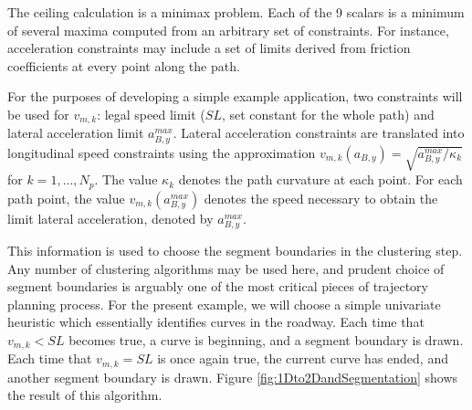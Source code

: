 \documentclass[letterpaper, 10 pt, conference]{ieeeconf}  %
\begin{document}
The ceiling calculation is a minimax problem.
Each of the 9 scalars is a minimum of several maxima computed from an arbitrary set of constraints.
For instance, acceleration constraints may include a set of limits derived from friction coefficients at every point along the path.

For the purposes of developing a simple example application, two constraints will be used for $v_{m,k}$: legal speed limit ($SL$, set constant for the whole path) and lateral acceleration limit $a_{B,y}^{max}$. 
Lateral acceleration constraints are translated into longitudinal speed constraints using the approximation $v_{m,k}(a_{B,y}) = \sqrt{a_{B,y}^{max}/\kappa_k}$ for $k = 1, ..., N_p$.
The value $\kappa_k$ denotes the path curvature at each point.
For each path point, the value $v_{m,k}(a_{B,y}^{max})$ denotes the speed necessary to obtain the limit lateral acceleration, denoted by $a^{max}_{B,y}$.

This information is used to choose the segment boundaries in the clustering step.
Any number of clustering algorithms may be used here, and prudent choice of segment boundaries is arguably one of the most critical pieces of trajectory planning process.
For the present example, we will choose a simple univariate heuristic which essentially identifies curves in the roadway.
Each time that $v_{m,k} < SL$ becomes true, a curve is beginning, and a segment boundary is drawn.
Each time that $v_{m,k} = SL$ is once again true, the current curve has ended, and another segment boundary is drawn.
Figure \ref{fig:1Dto2DandSegmentation} shows the result of this algorithm. 


\end{document}
